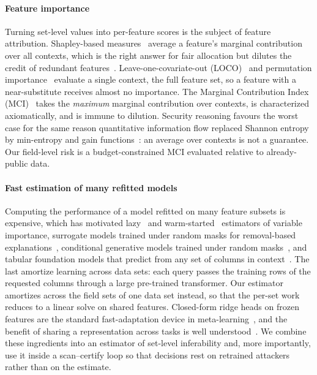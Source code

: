 \paragraph{Feature importance}
Turning set-level values into per-feature scores is the subject of feature attribution.
Shapley-based measures~\cite{shapley1953value,lundberg2017shap,covert2020sage,williamson2020spvim}
average a feature's marginal contribution over all contexts, which is the right answer for
fair allocation but dilutes the credit of redundant features~\cite{kumar2020shapley,catav2021mci}.
Leave-one-covariate-out (LOCO)~\cite{lei2018loco} and permutation importance~\cite{breiman2001rf,fisher2019mcr,hooker2021unrestricted}
evaluate a single context, the full feature set, so a feature with a near-substitute receives
almost no importance. The Marginal Contribution Index (MCI)~\cite{catav2021mci} takes the
\emph{maximum} marginal contribution over contexts, is characterized axiomatically, and is
immune to dilution. Security reasoning favours the worst case for the same reason
quantitative information flow replaced Shannon entropy by min-entropy and gain
functions~\cite{smith2009qif,alvim2012gleakage}: an average over contexts is not a guarantee.
Our field-level risk is a budget-constrained MCI evaluated relative to already-public data.

\paragraph{Fast estimation of many refitted models}
Computing the performance of a model refitted on many feature subsets is expensive, which has
motivated lazy~\cite{gao2022lazyvi} and warm-started~\cite{sun2025warmstart} estimators of
variable importance, surrogate models trained under random masks for removal-based
explanations~\cite{covert2021explaining,jethani2022fastshap,covert2023vitshapley}, conditional generative models trained under
random masks~\cite{ivanov2019vaeac,li2020acflow,yoon2020vime,he2022mae}, and tabular foundation models that predict from any
set of columns in context~\cite{hollmann2025tabpfn}. The last amortize learning across data sets: each query passes the
training rows of the requested columns through a large pre-trained transformer. Our estimator amortizes across the field
sets of one data set instead, so that the per-set work reduces to a linear solve on shared features.
Closed-form ridge heads on frozen features are the standard fast-adaptation device in
meta-learning~\cite{bertinetto2019r2d2,lee2019metaoptnet}, and the benefit of sharing a
representation across tasks is well understood~\cite{caruana1997multitask,baxter2000inductive,maurer2016benefit}.
We combine these ingredients into an estimator of set-level inferability and, more
importantly, use it inside a scan--certify loop so that decisions rest on retrained
attackers rather than on the estimate.


